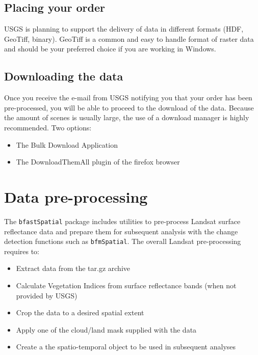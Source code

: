 \documentclass{article}\usepackage[]{graphicx}\usepackage[]{color}
\def\code#1{\texttt{#1}}
\begin{document}
\subsection{Placing your order}
USGS is planning to support the delivery of data in different formats (HDF, GeoTiff, binary). GeoTiff is a common and easy to handle format of raster data and should be your preferred choice if you are working in Windows.
\subsection{Downloading the data}
Once you receive the e-mail from USGS notifying you that your order has been pre-processed, you will be able to proceed to the download of the data. Because the amount of scenes is usually large, the use of a download manager is highly recommended. Two options:
\begin{itemize}
\item The Bulk Download Application
\item The DownloadThemAll plugin of the firefox browser
\end{itemize}




\section{Data pre-processing}
The \code{bfastSpatial} package includes utilities to pre-process Landsat surface reflectance data and prepare them for subsequent analysis with the change detection functions such as \code{bfmSpatial}. The overall Landsat pre-processing requires to:
\begin{itemize}
\item Extract data from the tar.gz archive
\item Calculate Vegetation Indices from surface reflectance bands (when not provided by USGS)
\item Crop the data to a desired spatial extent
\item Apply one of the cloud/land mask supplied with the data
\item Create a the spatio-temporal object to be used in subsequent analyses
\end{itemize}
\end{document}
